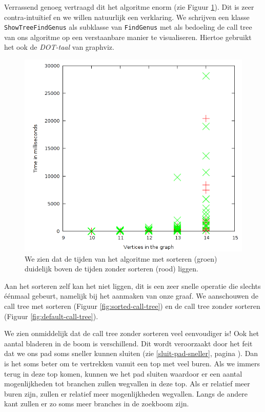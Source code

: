 \documentclass{article}
\begin{document}
Verrassend genoeg vertraagd dit het algoritme enorm (zie Figuur 
\ref{fig:bounded-vs-sorted}). Dit is zeer
contra-intu\"itief en we willen natuurlijk een verklaring. We schrijven een
klasse \verb#ShowTreeFindGenus# als subklasse van \verb#FindGenus# met als
bedoeling de call tree van ons algoritme op een verstaanbare manier te
visualiseren. Hiertoe gebruikt het ook de \emph{DOT-taal} van graphviz.
\newline

\begin{figure}
\begin{center}
\includegraphics[width=\textwidth]{images/bounded-vs-sorted.png}
\caption{We zien dat de tijden van het algoritme met sorteren (groen) duidelijk
boven de tijden zonder sorteren (rood) liggen.}
\label{fig:bounded-vs-sorted}
\end{center}
\end{figure}

Aan het sorteren zelf kan het niet liggen, dit is een zeer snelle operatie
die slechts \'e\'enmaal gebeurt, namelijk bij het aanmaken van onze graaf.
We aanschouwen de call tree met sorteren (Figuur \ref{fig:sorted-call-tree})
en de call tree zonder sorteren (Figuur \ref{fig:default-call-tree}).
\newline

We zien onmiddelijk dat de call tree zonder sorteren veel eenvoudiger is!
Ook het aantal bladeren in de boom is verschillend. Dit wordt veroorzaakt
door het feit dat we ons pad soms sneller kunnen sluiten (zie
\ref{sluit-pad-sneller}, pagina \pageref{sluit-pad-sneller}). Dan is het
soms beter om te vertrekken vanuit een top met veel buren. Als we immers
terug in deze top komen, kunnen we het pad sluiten waardoor er een aantal
mogenlijkheden tot branchen zullen wegvallen in deze top. Als er relatief
meer buren zijn, zullen er relatief meer mogenlijkheden wegvallen. Langs de
andere kant zullen er zo soms meer branches in de zoekboom zijn.
\newline
\end{document}
